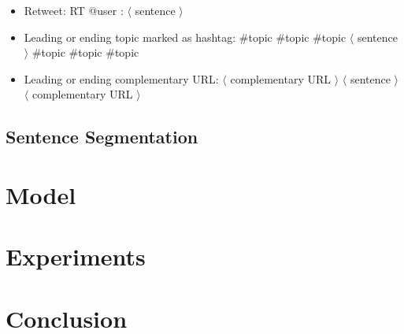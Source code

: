 \documentclass[11pt,letterpaper]{article}
\begin{document}
\begin{itemize}
\item Retweet: RT @user : $\langle$ sentence $\rangle$
\item Leading or ending topic marked as hashtag: \#topic \#topic \#topic $\langle$ sentence $\rangle$ \#topic \#topic \#topic
\item Leading or ending complementary URL:  $\langle$ complementary URL $\rangle$ $\langle$ sentence $\rangle$ $\langle$ complementary URL $\rangle$
\end{itemize}


\subsection{Sentence Segmentation}

\section{Model}

\section{Experiments}

\section{Conclusion}





\end{document}

